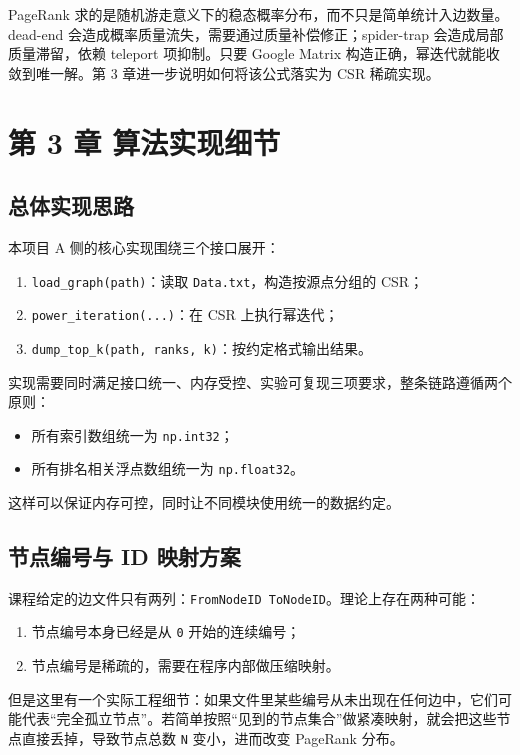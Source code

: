 \documentclass[UTF8,a4paper,12pt]{ctexart}
\begin{document}
PageRank 求的是随机游走意义下的稳态概率分布，而不只是简单统计入边数量。dead-end 会造成概率质量流失，需要通过质量补偿修正；spider-trap 会造成局部质量滞留，依赖 teleport 项抑制。只要 Google Matrix 构造正确，幂迭代就能收敛到唯一解。第 3 章进一步说明如何将该公式落实为 CSR 稀疏实现。

\section{第 3 章 算法实现细节}


\subsection{总体实现思路}


本项目 A 侧的核心实现围绕三个接口展开：


\begin{enumerate}
\item \texttt{load\_graph(path)}：读取 \texttt{Data.txt}，构造按源点分组的 CSR；
\item \texttt{power\_iteration(...)}：在 CSR 上执行幂迭代；
\item \texttt{dump\_top\_k(path, ranks, k)}：按约定格式输出结果。
\end{enumerate}


实现需要同时满足接口统一、内存受控、实验可复现三项要求，整条链路遵循两个原则：


\begin{itemize}
\item 所有索引数组统一为 \texttt{np.int32}；
\item 所有排名相关浮点数组统一为 \texttt{np.float32}。
\end{itemize}


这样可以保证内存可控，同时让不同模块使用统一的数据约定。


\subsection{节点编号与 ID 映射方案}


课程给定的边文件只有两列：\texttt{FromNodeID ToNodeID}。理论上存在两种可能：


\begin{enumerate}
\item 节点编号本身已经是从 \texttt{0} 开始的连续编号；
\item 节点编号是稀疏的，需要在程序内部做压缩映射。
\end{enumerate}


但是这里有一个实际工程细节：如果文件里某些编号从未出现在任何边中，它们可能代表“完全孤立节点”。若简单按照“见到的节点集合”做紧凑映射，就会把这些节点直接丢掉，导致节点总数 \texttt{N} 变小，进而改变 PageRank 分布。
\end{document}
